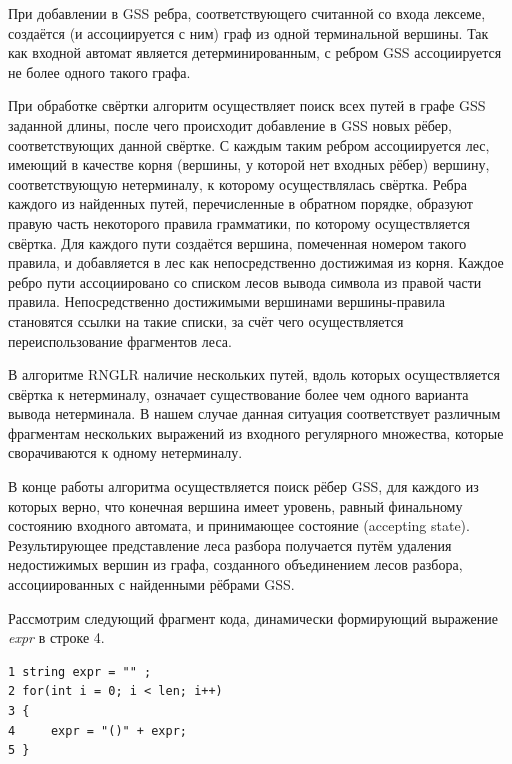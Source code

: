 При добавлении в GSS ребра, соответствующего считанной со входа лексеме, создаётся (и ассоциируется с ним) граф из одной терминальной вершины. Так как входной автомат является детерминированным, с ребром GSS ассоциируется не более одного такого графа.

При обработке свёртки алгоритм осуществляет поиск всех путей в графе GSS заданной длины, после чего происходит добавление в GSS новых рёбер, соответствующих данной свёртке. С каждым таким ребром ассоциируется лес, имеющий в качестве корня (вершины, у которой нет входных рёбер) вершину, соответствующую нетерминалу, к которому осуществлялась свёртка. Ребра каждого из найденных путей, перечисленные в обратном порядке, образуют правую часть некоторого правила грамматики, по которому осуществляется свёртка. Для каждого пути создаётся вершина, помеченная номером такого правила, и добавляется в лес как непосредственно достижимая из корня. Каждое ребро пути ассоциировано со списком лесов вывода символа из правой части правила. Непосредственно достижимыми вершинами вершины-правила становятся ссылки на такие списки, за счёт чего осуществляется переиспользование фрагментов леса.

В алгоритме RNGLR наличие нескольких путей, вдоль которых осуществляется свёртка к нетерминалу, означает существование более чем одного варианта вывода нетерминала. В нашем случае данная ситуация соответствует различным фрагментам нескольких выражений из входного регулярного множества, которые сворачиваются к одному нетерминалу. 

В конце работы алгоритма осуществляется поиск рёбер GSS, для каждого из которых верно, что конечная вершина имеет уровень, равный финальному состоянию входного автомата, и принимающее состояние (accepting state). Результирующее представление леса разбора получается путём удаления недостижимых вершин из графа, созданного объединением лесов разбора, ассоциированных с найденными рёбрами GSS.

Рассмотрим следующий фрагмент кода, динамически формирующий выражение \emph{expr} в строке 4. 
\begin{verbatim}
1 string expr = "" ;
2 for(int i = 0; i < len; i++) 
3 {
4     expr = "()" + expr;
5 }
\end{verbatim}

